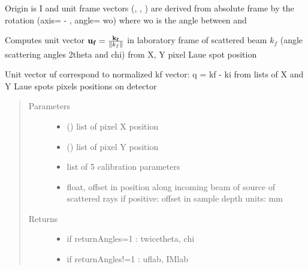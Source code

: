 \documentclass[letterpaper,10pt,english]{sphinxmanual}
\begin{document}

Origin is I and unit frame vectors (, , ) are derived
from absolute frame by the rotation (axis= - , angle= wo) where wo is the angle between  and 

\begin{fulllineitems}
\label{\detokenize{Simulation_Module:LaueTools.LaueGeometry.calc_uflab}}
Computes unit vector \({\bf u_f}=\frac{\bf k_f}{\|k_f\|}\) in laboratory frame of scattered beam \(k_f\)
(angle scattering angles 2theta and chi) from X, Y pixel Laue spot position

Unit vector uf correspond to normalized kf vector: q = kf - ki
from lists of X and Y Laue spots pixels positions on detector
\begin{quote}\begin{description}
\item[{Parameters}] \leavevmode\begin{itemize}
\item {} 
 () \textendash{} list of pixel X position

\item {} 
 () \textendash{} list of pixel Y position

\item {} 
 \textendash{} list of 5 calibration parameters

\item {} 
 \textendash{} float, offset in position along incoming beam of source of scattered rays
if positive: offset in sample depth
units: mm

\end{itemize}

\item[{Returns}] \leavevmode
\begin{itemize}
\item {} 
if returnAngles=1   : twicetheta, chi   

\item {} 
if returnAngles!=1  : uflab, IMlab

\end{itemize}


\end{description}\end{quote}

\end{fulllineitems}
\end{document}
